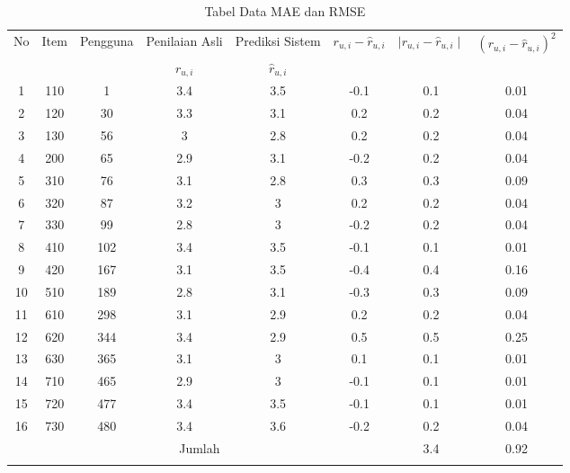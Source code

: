 \begin{longtable}[H]{|c|c|c|c|c|c|c|c|}
        \hline
        \multirow{2}{2em}{No} & Item & Pengguna & Penilaian Asli & Prediksi Sistem  & $r_{u,i}-\hat{r}_{u,i}$ & $\mid r_{u,i}-\hat{r}_{u,i} \mid$ & $(r_{u,i}-\hat{r}_{u,i})^2$ \\ 
        & & & $r_{u,i}$ & $\hat{r}_{u,i}$ & & &\\
        \hline
        1 & 110 & 1 & 3.4 & 3.5 & -0.1 & 0.1 & 0.01\\
        \hline
        2 & 120 & 30 & 3.3 & 3.1 & 0.2 & 0.2 & 0.04\\
        \hline
        3 & 130 & 56 & 3 & 2.8 & 0.2 & 0.2 & 0.04\\
        \hline
        4 & 200 & 65 & 2.9 & 3.1 & -0.2 & 0.2 & 0.04\\
        \hline
        5 & 310 & 76 & 3.1 & 2.8 & 0.3 & 0.3 & 0.09\\
        \hline
        6 & 320 & 87 & 3.2 & 3 & 0.2 & 0.2 & 0.04\\
        \hline
        7 & 330 & 99 & 2.8 & 3 & -0.2 & 0.2 & 0.04\\
        \hline
        8 & 410 & 102 & 3.4 & 3.5 & -0.1 & 0.1 & 0.01\\
        \hline
        9 & 420 & 167 & 3.1 & 3.5 & -0.4 & 0.4 & 0.16\\
        \hline
        10 & 510 & 189 & 2.8 & 3.1 & -0.3 & 0.3 & 0.09\\
        \hline
        11 & 610 & 298 & 3.1 & 2.9 & 0.2 & 0.2 & 0.04\\
        \hline
        12 & 620 & 344 & 3.4 & 2.9 & 0.5 & 0.5 & 0.25\\
        \hline
        13 & 630 & 365 & 3.1 & 3 & 0.1 & 0.1 & 0.01\\
        \hline
        14 & 710 & 465 & 2.9 & 3 & -0.1 & 0.1 & 0.01\\
        \hline
        15 & 720 & 477 & 3.4 & 3.5 & -0.1 & 0.1 & 0.01\\
        \hline
        16 & 730 & 480 & 3.4 & 3.6 & -0.2 & 0.2 & 0.04\\
        \hline
        \multicolumn{6}{|c|}{Jumlah} & 3.4 & 0.92 \\
        \hline
    \caption{Tabel Data MAE dan RMSE}
    \label{tab:tabel data mae dan rmse}
\end{longtable}

